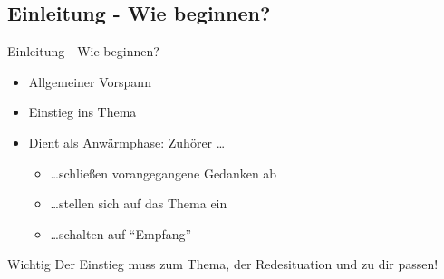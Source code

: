 \subsection{Einleitung - Wie beginnen?}
\begin{frame}{Einleitung - Wie beginnen?}
    \begin{itemize}[<+->]
        \item Allgemeiner Vorspann
        \item Einstieg ins Thema
        \item Dient als Anwärmphase: Zuhörer \dots
           \begin{itemize}[<+->]
            \item \dots schließen vorangegangene Gedanken ab
            \item \dots stellen sich auf das Thema ein
            \item \dots schalten auf "`Empfang"'
           \end{itemize}
    \end{itemize}

    \pause[\thebeamerpauses]
    \begin{alertblock}{Wichtig}
        Der Einstieg muss zum Thema, der Redesituation und zu dir
        passen!
    \end{alertblock}
\end{frame}
